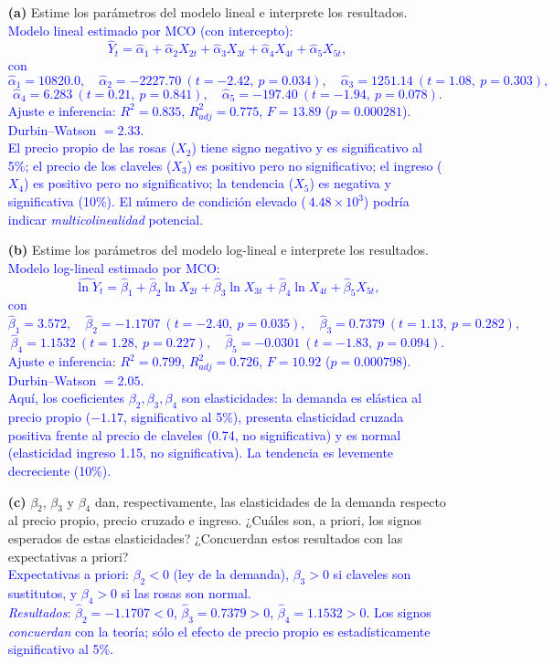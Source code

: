 \documentclass[10pt]{article}
\begin{document}
\begin{enumerate}
    \item[\textbf{(a)}] Estime los parámetros del modelo lineal e interprete los resultados.\\
    \textcolor{blue}{
        Modelo lineal estimado por MCO (con intercepto):
        \[
        \widehat{Y}_t= \hat{\alpha}_1 + \hat{\alpha}_2 X_{2t}+\hat{\alpha}_3 X_{3t}+\hat{\alpha}_4 X_{4t}+\hat{\alpha}_5 X_{5t},
        \]
        con $ \hat{\alpha}_1=10820.0,\quad \hat{\alpha}_2=-2227.70\ (t=-2.42,\ p=0.034),\quad \hat{\alpha}_3=1251.14\ (t=1.08,\ p=0.303),$
        \[
        \hat{\alpha}_4=6.283\ (t=0.21,\ p=0.841),\quad \hat{\alpha}_5=-197.40\ (t=-1.94,\ p=0.078).
        \]
        Ajuste e inferencia: \(R^2=0.835\), \(R^2_{adj}=0.775\), \(F=13.89\) (\(p=0.000281\)). Durbin–Watson \(=2.33\).\\
        El precio propio de las rosas (\(X_2\)) tiene signo negativo y es significativo al 5\%; el precio de los claveles (\(X_3\)) es positivo pero no significativo; el ingreso (\(X_4\)) es positivo pero no significativo; la tendencia (\(X_5\)) es negativa y significativa (10\%). El número de condición elevado (\(~4.48\times10^3\)) podría indicar \textit{multicolinealidad} potencial.
    }
    \item[\textbf{(b)}] Estime los parámetros del modelo log-lineal e interprete los resultados.\\
    \textcolor{blue}{
        Modelo log-lineal estimado por MCO:
        \[
        \widehat{\ln Y}_t= \hat{\beta}_1 + \hat{\beta}_2 \ln X_{2t}+\hat{\beta}_3 \ln X_{3t}+\hat{\beta}_4 \ln X_{4t}+\hat{\beta}_5 X_{5t},
        \]
        con $\hat{\beta}_1=3.572,\quad \hat{\beta}_2=-1.1707\ (t=-2.40,\ p=0.035),\quad \hat{\beta}_3=0.7379\ (t=1.13,\ p=0.282), $
        \[
        \hat{\beta}_4=1.1532\ (t=1.28,\ p=0.227),\quad \hat{\beta}_5=-0.0301\ (t=-1.83,\ p=0.094).
        \]
        Ajuste e inferencia: \(R^2=0.799\), \(R^2_{adj}=0.726\), \(F=10.92\) (\(p=0.000798\)). Durbin–Watson \(=2.05\).\\
        Aquí, los coeficientes \(\beta_2,\beta_3,\beta_4\) son elasticidades: la demanda es elástica al precio propio (\(-1.17\), significativo al 5\%), presenta elasticidad cruzada positiva frente al precio de claveles (0.74, no significativa) y es normal (elasticidad ingreso 1.15, no significativa). La tendencia es levemente decreciente (10\%).
        }

    \item[\textbf{(c)}] $\beta_2$, $\beta_3$ y $\beta_4$ dan, respectivamente, las elasticidades de la demanda respecto al precio propio, precio cruzado e ingreso. ¿Cuáles son, a priori, los signos esperados de estas elasticidades? ¿Concuerdan estos resultados con las expectativas a priori?\\
    \textcolor{blue}{
        Expectativas a priori: \(\beta_2<0\) (ley de la demanda), \(\beta_3>0\) si claveles son sustitutos, y \(\beta_4>0\) si las rosas son normal.\\
        \textit{Resultados}: \(\hat{\beta}_2=-1.1707<0\), \(\hat{\beta}_3=0.7379>0\), \(\hat{\beta}_4=1.1532>0\). Los signos \emph{concuerdan} con la teoría; sólo el efecto de precio propio es estadísticamente significativo al 5\%.
        }


\end{enumerate}
\end{document}

